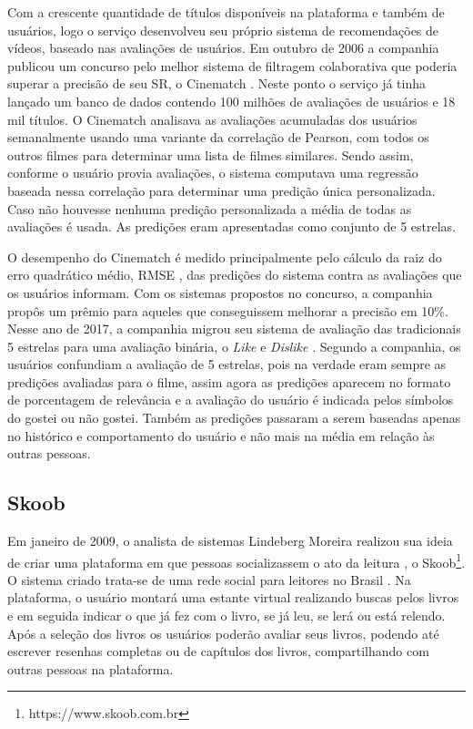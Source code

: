 Com a crescente quantidade de títulos disponíveis na plataforma e também de usuários, logo o serviço desenvolveu seu próprio sistema de recomendações de vídeos, baseado nas avaliações de usuários. Em outubro de 2006 a companhia publicou um concurso pelo melhor sistema de filtragem colaborativa que poderia superar a precisão de seu SR, o Cinematch \citep{bennett2007netflix}. Neste ponto o serviço já tinha lançado um banco de dados contendo 100 milhões de avaliações de usuários e 18 mil títulos. O Cinematch analisava as avaliações acumuladas dos usuários semanalmente usando uma variante da correlação de Pearson, com todos os outros filmes para determinar uma lista de filmes similares. Sendo assim, conforme o usuário provia avaliações, o sistema computava uma regressão baseada nessa correlação para determinar uma predição única personalizada. Caso não houvesse nenhuma predição personalizada a média de todas as avaliações é usada. As predições eram apresentadas como conjunto de 5 estrelas.

O desempenho do Cinematch é medido principalmente pelo cálculo da raiz do erro quadrático médio, RMSE \citep{Herlocker:2004:ECF:963770.963772}, das predições do sistema contra as avaliações que os usuários informam. Com os sistemas propostos no concurso, a companhia propôs um prêmio para aqueles que conseguissem melhorar a precisão em 10\%. Nesse ano de 2017, a companhia migrou seu sistema de avaliação das tradicionais 5 estrelas para uma avaliação binária, o \textit{Like} e \textit{Dislike} \citep{ VarietyNetflix:2017}. Segundo a companhia, os usuários confundiam a avaliação de 5 estrelas, pois na verdade eram sempre as predições avaliadas para o filme, assim agora as predições aparecem no formato de porcentagem de relevância e a avaliação do usuário é indicada pelos símbolos do gostei ou não gostei. Também as predições passaram a serem baseadas apenas no histórico e comportamento do usuário e não mais na média em relação às outras pessoas.

\subsection{Skoob}

Em janeiro de 2009, o analista de sistemas Lindeberg Moreira realizou sua ideia de criar uma plataforma em que pessoas socializassem o ato da leitura \citep{SkoobSocializando:2009}, o Skoob\footnote{ https://www.skoob.com.br}. O sistema criado trata-se de uma rede social para leitores no Brasil \citep{SkoobQuemSomos:2017}. Na plataforma, o usuário montará uma estante virtual realizando buscas pelos livros e em seguida indicar o que já fez com o livro, se já leu, se lerá ou está relendo. Após a seleção dos livros os usuários poderão avaliar seus livros, podendo até escrever resenhas completas ou de capítulos dos livros, compartilhando com outras pessoas na plataforma.

